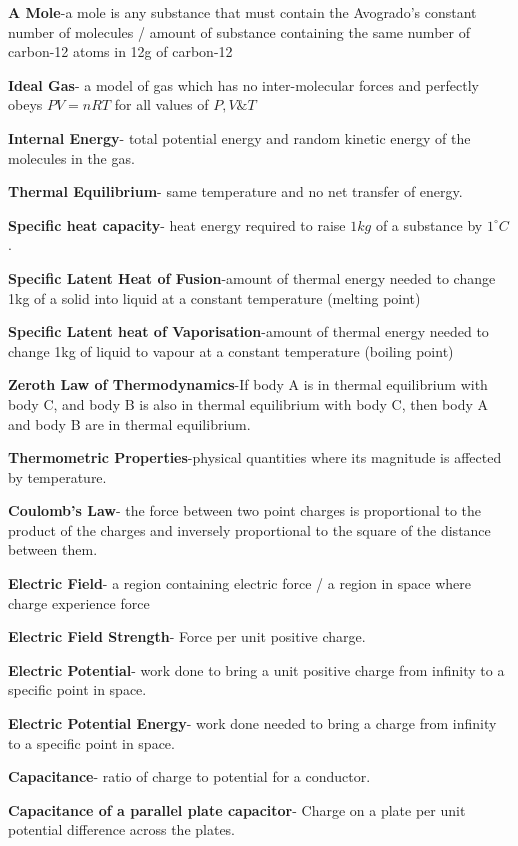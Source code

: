 \documentclass{article}
\begin{document}
\begin{flushleft}
 \textbf{A Mole}-a mole is any substance that must contain the Avogrado's constant number of molecules / amount of substance containing the same number of carbon-12 atoms in 12g of carbon-12
 
 \textbf{Ideal Gas}- a model of gas which has no inter-molecular forces and perfectly obeys $PV=nRT$ for all values of $P,V\&T$
 
 \textbf{Internal Energy}- total potential energy and random kinetic energy of the molecules in the gas.
 
 \textbf{Thermal Equilibrium}- same temperature and no net transfer of energy.
 
  \textbf{Specific heat capacity}- heat energy required to raise $1 kg$ of a substance by $1 ^{\circ} C$.
 
 \textbf{Specific Latent Heat of Fusion}-amount of thermal energy needed to change 1kg of a solid into liquid at a constant temperature (melting point)
 
 \textbf{Specific Latent heat of Vaporisation}-amount of thermal energy needed to change 1kg of liquid to vapour at a constant temperature (boiling point)
 
 \textbf{Zeroth Law of Thermodynamics}-If body A is in thermal equilibrium with body C, and body B is also in thermal equilibrium with body C, then body A and body B are in thermal equilibrium.
 
 \textbf{Thermometric Properties}-physical quantities where its magnitude is affected by temperature.
 
 \textbf{Coulomb's Law}- the force between two point charges is proportional to the product of the charges and inversely proportional to the square of the distance between them.
 
 \textbf{Electric Field}- a region containing electric force / a region in space where charge experience force
 
 \textbf{Electric Field Strength}- Force per unit positive charge.
 
 \textbf{Electric Potential}- work done to bring a unit positive charge from infinity to a specific point in space.
 
 \textbf{Electric Potential Energy}- work done needed to bring a charge from infinity to a specific point in space.
 
 \textbf{Capacitance}- ratio of charge to potential for a conductor.
 
 \textbf{Capacitance of a parallel plate capacitor}- Charge on a plate per unit potential difference across the plates.
 

\end{flushleft}
\end{document}
